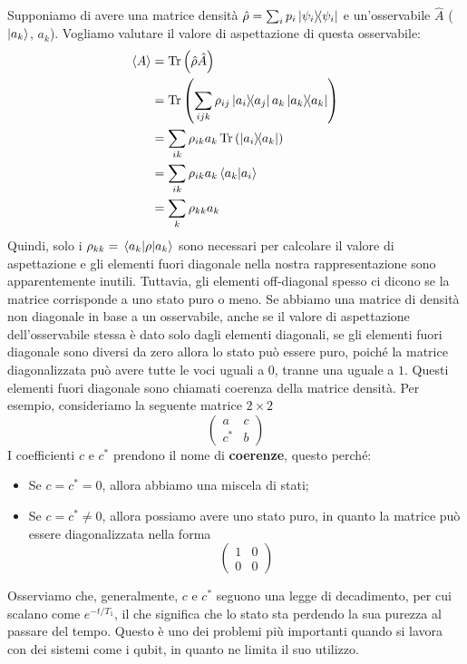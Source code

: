 \noindent Supponiamo di avere una matrice densità $\hat \rho=\sum_i p_i \op{\psi_i}{\psi_i}$ e un'osservabile $\hat A$ ($\ket {a_k}$, $a_k$). Vogliamo valutare il valore di aspettazione di questa osservabile:
\begin{equation*}
    \begin{aligned}
        \expval{A} &= \Tr\left(\hat\rho \hat A\right) \\
                   &= \Tr\left(\sum_{ijk} \rho_{ij}\op{a_i}{a_j}a_k\op{a_k}{a_k}\right) \\
                   &= \sum_{ik}\rho_{ik}a_k\Tr\left(\op{a_i}{a_k}\right) \\
                   &= \sum_{ik}\rho_{ik}a_k\ip{a_k}{a_i} \\
                   &= \sum_k\rho_{kk}a_k
    \end{aligned}
\end{equation*}
Quindi, solo i $\rho_{kk}=\mel{a_k}{\rho}{a_k}$ sono necessari per calcolare il valore di aspettazione e gli elementi fuori diagonale nella nostra rappresentazione sono apparentemente inutili. Tuttavia, gli elementi off-diagonal spesso ci dicono se la matrice corrisponde a uno stato puro o meno. Se abbiamo una matrice di densità non diagonale in base a un osservabile, anche se il valore di aspettazione dell'osservabile stessa è dato solo dagli elementi diagonali, se gli elementi fuori diagonale sono diversi da zero allora lo stato può essere puro, poiché la matrice diagonalizzata può avere tutte le voci uguali a $0$, tranne una uguale a $1$. Questi elementi fuori diagonale sono chiamati coerenza della matrice densità. Per esempio, consideriamo la seguente matrice $2\times 2$
\begin{equation*}
    \begin{pmatrix}
        a & c \\
        c^* & b
    \end{pmatrix}
\end{equation*}
I coefficienti $c$ e $c^*$ prendono il nome di \textbf{coerenze}, questo perché:
\begin{itemize}
    \item Se $c=c^*=0$, allora abbiamo una miscela di stati;
    \item Se $c=c^*\neq 0$, allora possiamo avere uno stato puro, in quanto la matrice può essere diagonalizzata nella forma
        \begin{equation*}
            \begin{pmatrix}
                1 & 0 \\
                0 & 0
            \end{pmatrix}
        \end{equation*}
\end{itemize}
Osserviamo che, generalmente, $c$ e $c^*$ seguono una legge di decadimento, per cui scalano come $e^{-t/T_1}$, il che significa che lo stato sta perdendo la sua purezza al passare del tempo. Questo è uno dei problemi più importanti quando si lavora con dei sistemi come i qubit, in quanto ne limita il suo utilizzo.